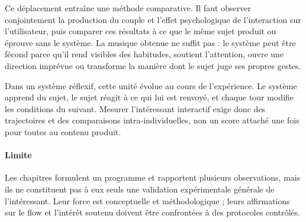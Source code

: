 \documentclass[10pt,a4paper]{article}
\begin{document}
Ce déplacement entraîne une méthode comparative. Il faut observer conjointement la production du couple et l'effet psychologique de l'interaction sur l'utilisateur, puis comparer ces résultats à ce que le même sujet produit ou éprouve sans le système. La musique obtenue ne suffit pas : le système peut être fécond parce qu'il rend visibles des habitudes, soutient l'attention, ouvre une direction imprévue ou transforme la manière dont le sujet juge ses propres gestes.

Dans un système réflexif, cette unité évolue au cours de l'expérience. Le système apprend du sujet, le sujet réagit à ce qui lui est renvoyé, et chaque tour modifie les conditions du suivant. Mesurer l'intéressant interactif exige donc des trajectoires et des comparaisons intra-individuelles, non un score attaché une fois pour toutes au contenu produit.

\paragraph{Limite}
Les chapitres formulent un programme et rapportent plusieurs observations, mais ils ne constituent pas à eux seuls une validation expérimentale générale de l'intéressant. Leur force est conceptuelle et méthodologique ; leurs affirmations sur le flow et l'intérêt soutenu doivent être confrontées à des protocoles contrôlés.
\end{document}
